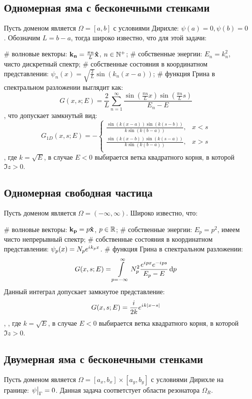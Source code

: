 \subsection{Одномерная яма с бесконечными стенками}
Пусть доменом является $\Omega = [a, b]$ с условиями Дирихле: $\psi(a) = 0, \psi(b) = 0$. Обозначим $L = b - a$, тогда широко известно, что для этой задачи:
\begin{ilist}
# волновые векторы: $\vb{k_n} = \frac{\pi n}{L} \vb{\hat{x}}$, $n \in \mathbb{N}^+$;
# собственные энергии: $E_n = k_n^2$, чисто дискретный спектр;
# собственные состояния в координатном представлении: $\psi_n(x) = \sqrt{\frac{2}{L}} \sin(k_n (x - a))$;
# функция Грина в спектральном разложении выглядит как:
\[
G(x, s; E) = \frac{2}{L} \sum\limits_{n = 1}^\infty \frac{\sin(\frac{\pi n}{L} x) \sin(\frac{\pi n}{L} s)}{E_n - E}
\]
, что допускает замкнутый вид:
\[
G_{1D}(x, s; E) = -\begin{cases}
\frac{\sin(k(x - a)) \sin(k(s - b))}{k \sin(k(b - a))}, & x < s \\
\frac{\sin(k(x - b)) \sin(k(s - a))}{k \sin(k(b - a))}, & x > s \\
\end{cases}
\]
, где $k = \sqrt{E}$, в случае $E < 0$ выбирается ветка квадратного корня, в которой $\Im z > 0$.
\end{ilist}

\subsection{Одномерная свободная частица}
Пусть доменом является $\Omega = (-\infty, \infty)$. Широко известно, что:
\begin{ilist}
# волновые векторы: $\vb{k_{p}} = p \vb{\hat{x}}$, $p \in \mathbb{R}$;
# собственные энергии: $E_p = p^2$, имеем чисто непрерывный спектр;
# собственные состояния в координатном представлении: $\psi_p(x) = N_p e^{{i\mkern1mu} k_p x}$. 
# функция Грина в спектральном разложении:
\[
G(x, s; E) = \int\limits_{p = -\infty}^\infty N_p^2 \frac{e^{{i\mkern1mu} p x} e^{-{i\mkern1mu} p s}}{E_p - E} \dd{p}
\]
Данный интеграл допускает замкнутое представление:
\[
G(x, s; E) = \frac{{i\mkern1mu}}{2 k} e^{{i\mkern1mu} k |x - s|}
\],
, где $k = \sqrt{E}$, в случае $E < 0$ выбирается ветка квадратного корня, в которой $\Im z > 0$.
\end{ilist}

\subsection{Двумерная яма с бесконечными стенками}
Пусть доменом является $\Omega = [a_x, b_x] \times [a_y, b_y]$ с условиями Дирихле на границе: $\eval{\psi}_{\Gamma} = 0$. Данная задача соответстует области резонатора $\Omega_R$.

